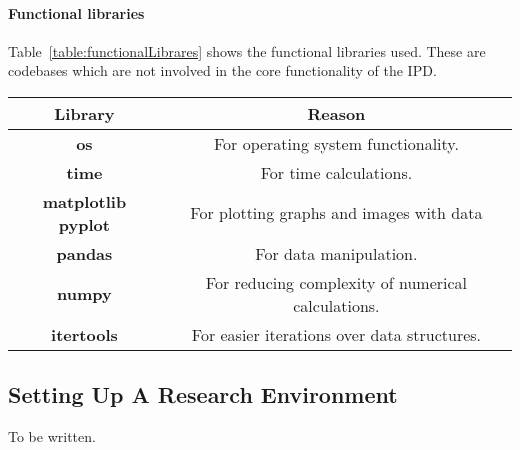 \paragraph{Functional libraries}
Table~\ref{table:functionalLibrares} shows the functional libraries used.
These are codebases which are not involved in the core functionality of the IPD.
\begin{table*}[h]
    \centering
    \begin{tabular}{cc}
        \toprule
        Library & Reason\\
        \midrule
        \textbf{os} & For operating system functionality.\\
        \textbf{time} & For time calculations.\\
        \textbf{matplotlib pyplot} & For plotting graphs and images with data\\
        \textbf{pandas} & For data manipulation.\\
        \textbf{numpy} & For reducing complexity of numerical calculations.\\
        \textbf{itertools} & For easier iterations over data structures.\\
        \bottomrule
    \end{tabular}
    \caption{Functional Python libraries for analysis}\label{table:functionalLibrares}
\end{table*}


\subsection{Setting Up A Research Environment}
To be written.